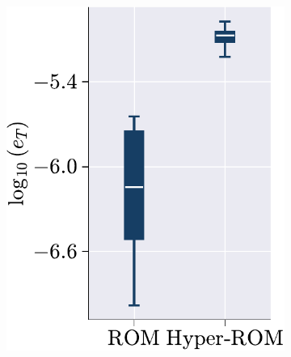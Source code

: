\documentclass[11pt]{article}
\begin{document}
\begin{figure}[t!]
\begin{subfigure}[b]{0.33\linewidth}
\includegraphics[height=1.3\linewidth]{error_comp_rom_hrom_ecm.pdf}
\caption{}
\label{fig:HROM_ERROR_SPDUP__ecm_a}
\end{subfigure}
\begin{subfigure}[b]{0.33\linewidth}
\centering

\end{subfigure}
\end{figure}
\end{document}
